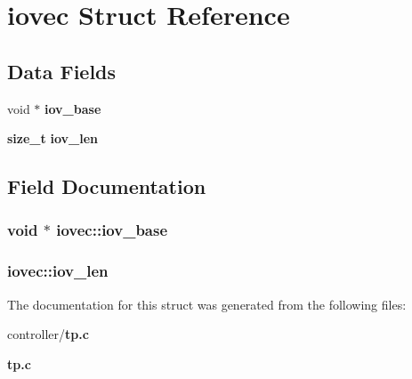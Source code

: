 \section{iovec Struct Reference}
\label{structiovec}
\subsection*{Data Fields}
\begin{DoxyCompactItemize}
\item 
void $\ast$ {\bf iov\_\-base}
\item 
{\bf size\_\-t} {\bf iov\_\-len}
\end{DoxyCompactItemize}


\subsection{Field Documentation}
\subsubsection[{iov\_\-base}]{\setlength{\rightskip}{0pt plus 5cm}void $\ast$ {\bf iovec::iov\_\-base}}\label{structiovec_a03d7cd6fabcba6523b6366738c691321}
\subsubsection[{iov\_\-len}]{ {\bf iovec::iov\_\-len}}\label{structiovec_a17b5ac2078fd1adfabb262a95808a07d}


The documentation for this struct was generated from the following files:\begin{DoxyCompactItemize}
\item 
controller/{\bf tp.c}\item 
{\bf tp.c}\end{DoxyCompactItemize}
